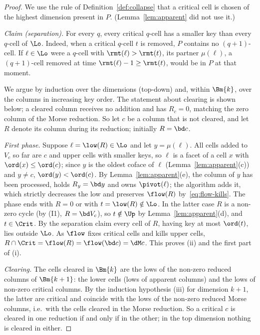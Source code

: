 \begin{proof}
We use the rule of Definition~\ref{def:collapse} that a critical cell is chosen
of the highest dimension present in $P$. (Lemma~\ref{lem:apparent} did not use
it.)

\emph{Claim (separation).} For every $q$, every critical $q$-cell has a smaller
key than every $q$-cell of $\Lo$. Indeed, when a critical $q$-cell $t$ is removed,
$P$ contains no $(q+1)$-cell. If $\ell\in\Lo$ were a $q$-cell with
$\rmt(\ell)>\rmt(t)$, its partner $\mu(\ell)$, a $(q+1)$-cell removed at time
$\rmt(\ell)-1\ge\rmt(t)$, would be in $P$ at that moment.

We argue by induction over the dimensions (top-down) and, within $\Bm{k}$, over
the columns in increasing key order. The statement about clearing is shown below;
a cleared column receives no addition and has $R_c=0$, matching the zero column
of the Morse reduction. So let $c$ be a column that is not cleared, and let $R$
denote its column during its reduction; initially $R=\bd c$.

\emph{First phase.} Suppose $\ell=\low(R)\in\Lo$ and let $y=\mu(\ell)$. All cells
added to $V_c$ so far are $c$ and upper cells with smaller keys, so $\ell$ is a
facet of a cell $x$ with $\ord(x)\le\ord(c)$; since $y$ is the oldest coface of
$\ell$ (Lemma~\ref{lem:apparent}(c)) and $y\ne c$, $\ord(y)<\ord(c)$. By
Lemma~\ref{lem:apparent}(e), the column of $y$ has been processed, holds
$R_y=\bd y$ and owns $\pivot(\ell)$; the algorithm adds it, which
strictly decreases the low and preserves $\flow(R)$ by~\eqref{eq:flow-kills}.
The phase ends with $R=0$ or with $t=\low(R)\notin\Lo$. In the latter case $R$
is a non-zero cycle (by (I1), $R=\bd V_c$), so $t\notin\Up$ by
Lemma~\ref{lem:apparent}(d), and $t\in\Crit$. By the separation claim every
cell of $R$, having key at most $\ord(t)$, lies outside $\Lo$. As $\flow$ fixes
critical cells and kills upper cells,
$R\cap\Crit=\flow(R)=\flow(\bd c)=\dM c$. This proves (ii) and the first part
of (i).

\emph{Clearing.} The cells cleared in $\Bm{k}$ are the lows of the non-zero
reduced columns of $\Bm{k+1}$: the lower cells (lows of apparent columns) and
the lows of non-zero critical columns. By the induction hypothesis (iii) for
dimension $k+1$, the latter are critical and coincide with the lows of the
non-zero reduced Morse columns, i.e.\ with the cells cleared in the Morse
reduction. So a critical $c$ is cleared in one reduction if and only if in the
other; in the top dimension nothing is cleared in either.


\end{proof}
